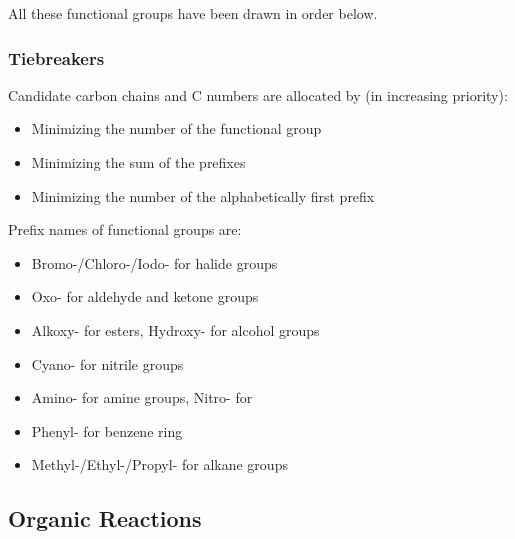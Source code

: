 \documentclass[../main]{subfiles}
\begin{document}
	All these functional groups have been drawn in order below.


	\subsubsection{Tiebreakers}

	Candidate carbon chains and C numbers are allocated by (in increasing priority):
	\begin{itemize}
		\item Minimizing the number of the functional group
		\item Minimizing the sum of the prefixes
		\item Minimizing the number of the alphabetically first prefix
	\end{itemize}

	Prefix names of functional groups are:
	\begin{itemize}
		\item Bromo-/Chloro-/Iodo- for halide groups
		\item Oxo- for aldehyde and ketone groups
		\item Alkoxy- for esters, Hydroxy- for alcohol groups
		\item Cyano- for nitrile groups
		\item Amino- for amine groups, Nitro- for 
		\item Phenyl- for benzene ring
		\item Methyl-/Ethyl-/Propyl- for alkane groups
	\end{itemize}

	\subsection{Organic Reactions}
\end{document}
